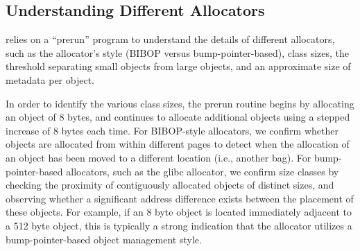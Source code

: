 \label{sec:implement}





\subsection{Understanding Different Allocators}

\label{sec:understandingallocators}

\MP{} relies on a ``prerun'' program to understand the details of different allocators, such as the allocator's style (BIBOP versus bump-pointer-based), class sizes, the threshold separating small objects from large objects, and an approximate size of metadata per object. 

In order to identify the various class sizes, the prerun routine begins by allocating an object of 8 bytes, and continues to allocate  additional objects using a stepped increase of 8 bytes each time. For BIBOP-style allocators, we confirm whether objects are allocated from within different pages to detect when the allocation of an object has been moved to a different location (i.e., another bag). 
For bump-pointer-based allocators, such as the glibc allocator, we confirm size classes by checking the proximity of contiguously allocated objects of distinct sizes, and observing whether a significant address difference exists between the placement of these objects. For example, if an 8 byte object is located immediately adjacent to a 512 byte object, this is typically a strong indication that the allocator utilizes a bump-pointer-based object management style.

